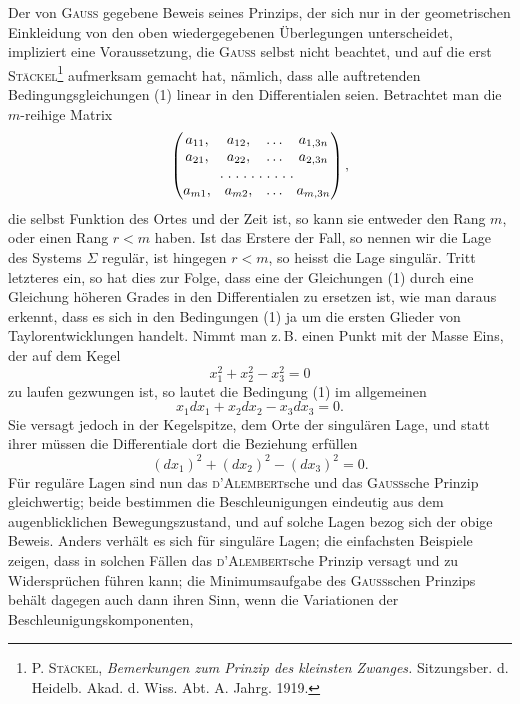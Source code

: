 Der von \textsc{Gauss} gegebene Beweis seines Prinzips, der sich nur in der
geometrischen Einkleidung von den oben wiedergegebenen Überlegungen unterscheidet,
impliziert eine Voraussetzung, die \textsc{Gauss} selbst nicht beachtet, und
auf die erst \textsc{Stäckel}\footnote{P. \textsc{Stäckel}, \textit{Bemerkungen zum Prinzip des kleinsten Zwanges.} Sitzungsber. d. Heidelb. Akad.
d. Wiss. Abt. A. Jahrg. 1919.} aufmerksam gemacht hat, nämlich, dass alle auftretenden
Bedingungsgleichungen (1) linear in den Differentialen seien. Betrachtet
man die $m$-reihige Matrix
\[
\left(\begin{array}{@{}cccc@{}}
a_{11},&a_{12},&.\, .\, .&a_{1,3n}\\
a_{21},&a_{22},&.\, .\, .&a_{2,3n}\\
\multicolumn{4}{c}{.\; .\; .\; .\; .\; .\; .\; .\; .\; .}\\
a_{m1},&a_{m2},&.\, .\, .&a_{m,3n}
\end{array}\right),
\]
\noindent die selbst Funktion des Ortes und der Zeit ist, so kann sie entweder den
Rang $m$, oder einen Rang $r<m$ haben. Ist das Erstere der Fall, so nennen wir
die Lage des Systems $\Sigma$ regulär, ist hingegen $r<m$, so heisst die Lage
singulär. Tritt letzteres ein, so hat dies zur Folge, dass eine der Gleichungen
(1) durch eine Gleichung höheren Grades in den Differentialen zu ersetzen
ist, wie man daraus erkennt, dass es sich in den Bedingungen (1) ja um die
ersten Glieder von Taylorentwicklungen handelt. Nimmt man z.\,B. einen
Punkt mit der Masse Eins, der auf dem Kegel
\[
x_1^2+x_2^2-x_3^2=0
\]
\clearpage{}
\noindent zu laufen gezwungen ist, so lautet die Bedingung (1) im allgemeinen
\[
x_1dx_1+x_2dx_2-x_3dx_3=0.
\]
\noindent Sie versagt jedoch in der Kegelspitze, dem Orte der singulären Lage, und
statt ihrer müssen die Differentiale dort die Beziehung erfüllen
\[
(dx_1)^2+(dx_2)^2-(dx_3)^2=0.
\]
\noindent Für reguläre Lagen sind nun das \textsc{d’Alembert}sche und das \textsc{Gauss}sche Prinzip
gleichwertig; beide bestimmen die Beschleunigungen eindeutig aus dem augenblicklichen
Bewegungszustand, und auf solche Lagen bezog sich der obige
Beweis. Anders verhält es sich für singuläre Lagen; die einfachsten Beispiele
zeigen, dass in solchen Fällen das \textsc{d’Alembert}sche Prinzip versagt und zu
Widersprüchen führen kann; die Minimumsaufgabe des \textsc{Gauss}schen Prinzips
behält dagegen auch dann ihren Sinn, wenn die Variationen der Beschleunigungskomponenten,
